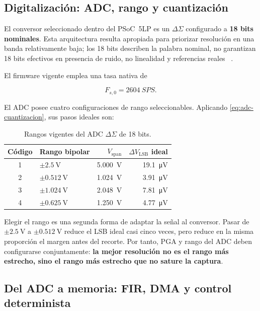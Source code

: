 \subsection{Digitalizaci\'on: ADC, rango y cuantizaci\'on}

El conversor seleccionado dentro del PSoC~5LP es un $\Delta\Sigma$ configurado a
\textbf{18 bits nominales}. Esta arquitectura resulta apropiada para priorizar resoluci\'on
en una banda relativamente baja; los 18 bits describen la palabra nominal, no garantizan
18 bits efectivos en presencia de ruido, no linealidad y referencias reales
~\cite{InfineonPSoC}.

El firmware vigente emplea una tasa nativa de

\begin{equation}
F_{s,0}=\SI{2604}{SPS}.
\end{equation}

El ADC posee cuatro configuraciones de rango seleccionables. Aplicando
\eqref{eq:adc-cuantizacion}, sus pasos ideales son:

\begin{table}[ht]
\centering
\footnotesize
\caption{Rangos vigentes del ADC $\Delta\Sigma$ de 18 bits.}
\label{tab:rangos-adc}
\begin{tabular}{@{}clrr@{}}
\toprule
\textbf{C\'odigo} & \textbf{Rango bipolar} & $V_{\mathrm{span}}$ & $\Delta V_{\mathrm{LSB}}$ ideal \\
\midrule
1 & $\pm\SI{2.5}{\volt}$   & \SI{5.000}{\volt} & \SI{19.1}{\micro\volt} \\
2 & $\pm\SI{0.512}{\volt}$ & \SI{1.024}{\volt} & \SI{3.91}{\micro\volt} \\
3 & $\pm\SI{1.024}{\volt}$ & \SI{2.048}{\volt} & \SI{7.81}{\micro\volt} \\
4 & $\pm\SI{0.625}{\volt}$ & \SI{1.250}{\volt} & \SI{4.77}{\micro\volt} \\
\bottomrule
\end{tabular}
\end{table}

Elegir el rango es una segunda forma de adaptar la se\~nal al conversor. Pasar de
$\pm\SI{2.5}{\volt}$ a $\pm\SI{0.512}{\volt}$ reduce el LSB ideal casi cinco veces,
pero reduce en la misma proporci\'on el margen antes del recorte. Por tanto, PGA y rango
del ADC deben configurarse conjuntamente: \textbf{la mejor resoluci\'on no es el rango m\'as
estrecho, sino el rango m\'as estrecho que no sature la captura}.

\subsection{Del ADC a memoria: FIR, DMA y control determinista}

